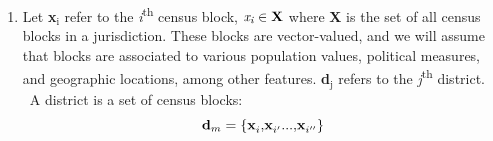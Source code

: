 \documentclass[article]{JSSstyle/jss}
\newcommand\textsubscript[1]{\ensuremath{{}_{\text{#1}}}}
\begin{document}
\begin{enumerate}
\item Let \textbf{x}\textit{\textsubscript{i}} refer to the
\textit{i}\textsuperscript{th} census block, $\textit{x}\textit{\textsubscript{i}}\in{\textbf{X}}$ 
where \textbf{X} is the set of all census blocks in a jurisdiction. These blocks are
vector{}-valued, and we will assume that blocks are associated to various
population values, political measures, and geographic
locations, among other features.
\textbf{d}\textit{\textsubscript{j}} refers to the
\textit{j}\textsuperscript{th} district. \ A district is a set of
census blocks: 
\[                                                    
{\bf d}_m  = \left\{ {{\bf x}_i^{} {\rm ,}{\bf x}_{i'}^{} ...{\rm ,}{\bf x}_{i''}^{} } \right\}
\]


\end{enumerate}
\end{document}
